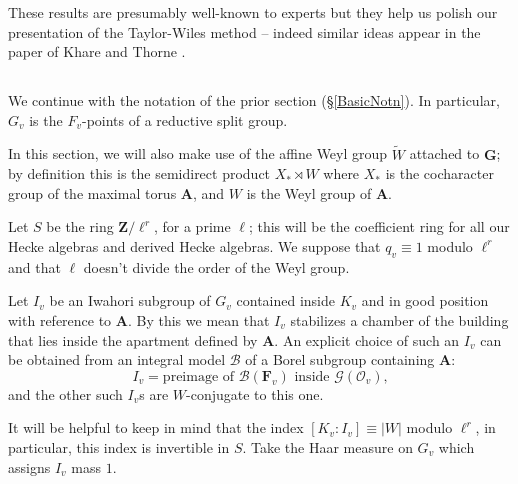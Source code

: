 \documentclass[10pt]{amsart}
\newcommand{\changecolor}{black}
\newcommand{\Z}{\mathbf{Z}}
\theoremstyle{remark}
\begin{document}
 These results are presumably well-known to experts
but they help us polish our presentation of the Taylor-Wiles method -- indeed similar ideas appear in the paper of Khare and Thorne \cite{KT}.


\subsection{} 
 
 We continue with the notation of the prior section (\S \ref{BasicNotn}). 
 In particular, $G_v$ is the $F_v$-points of a reductive split group. 
 
 In this section, we will also make use of the affine Weyl group $\tilde{W}$ attached to $\mathbf{G}$; by definition
 this is the semidirect product $X_*  \rtimes W$  where $X_*$ is the cocharacter group of  the maximal torus $\mathbf{A}$,
 and $W$ is the Weyl group of $\mathbf{A}$. 
 
 Let $S$ be the ring $\Z/\ell^r$, for a prime $\ell$; this will be the coefficient ring for all our Hecke algebras and derived Hecke algebras.    We suppose that $q_v \equiv 1$ modulo $\ell^r$
 and that $\ell$ doesn't divide the order of the Weyl group.  

{\color{\changecolor} Let $I_v$ be an Iwahori subgroup of $G_v$ contained inside $K_v$ and in good position with reference to $\mathbf{A}$.  By this we mean that $I_v$ stabilizes
a chamber of the building that lies inside the apartment defined by $\mathbf{A}$. 
 An explicit choice of such an $I_v$ can be obtained from an integral model $\mathcal{B}$ of a Borel subgroup containing $\mathbf{A}$:
$$ I_v = \mbox{preimage of $\mathcal{B}(\mathbf{F}_v)$ inside $\mathcal{G}(\mathcal{O}_v)$,}$$
and the other such $I_v$s are $W$-conjugate to this one. }

It will be helpful to keep in mind that the index $[K_v:I_v] \equiv |W|$ modulo $\ell^r$, in particular, this index is invertible in $S$.
  Take the Haar measure on $G_v$ which assigns $I_v$ mass $1$.

  
\end{document}
